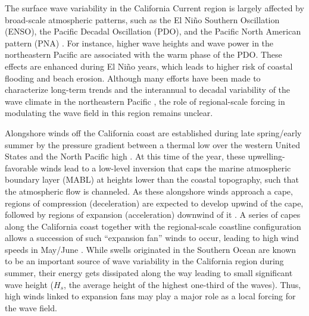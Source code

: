 The surface wave variability in the California Current region is largely
affected by broad-scale atmospheric patterns, such as the El Ni\~{n}o Southern Oscillation (ENSO), the Pacific Decadal Oscillation (PDO), and the Pacific North American pattern (PNA) \citep{bromirski2005wave, bromirski2013wave, adams2008southern}. 
For instance, higher wave heights \citep{adams2008southern} and wave power \citep{bromirski2013wave} in the northeastern Pacific are associated with the warm phase of the PDO. These effects are enhanced during El Ni\~{n}o years, which leads to higher risk of coastal flooding and beach erosion. 
Although many efforts have been made to characterize long-term trends and the interannual to decadal variability of the wave climate in the northeastern Pacific \citep[e.g.,][]{seymour1984elnino,seymour1996wave,bromirski2005wave}, the role of regional-scale forcing in modulating the wave field in this region remains unclear. 

Alongshore winds off the California coast are established during late spring/early summer by the 
pressure gradient between a thermal low over the western United States and the North Pacific high \citep{zemba1987marine, koravcin2004coastal}. 
At this time of the year, these upwelling-favorable winds lead to a low-level inversion that caps the marine atmospheric boundary layer (MABL) at heights lower than the coastal topography, such that the atmospheric flow is channeled. As these alongshore winds approach a cape, regions of compression (deceleration) are expected to develop upwind of the cape, followed by regions of expansion (acceleration) downwind of it \citep{winant1988marine,koravcin2001marine,taylor2008northerly}. 
A series of capes along the California coast together with the regional-scale coastline configuration allows a succession of such ``expansion fan'' winds to occur, leading to high wind speeds in May/June \citep{koravcin2001marine, koravcin2004coastal}. While swells originated in the Southern Ocean are known to be an important source of wave variability in the California region during summer, their energy gets dissipated along the way \citep{ardhuin2010semiempirical, ardhuin2009observation} leading to small significant wave height ($H_s$, the average height of the highest one-third of the waves). Thus, high winds linked to expansion fans may play a major role as a local forcing for the wave field. 

